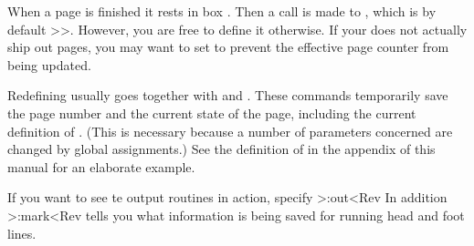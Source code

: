When a page is finished it rests in box . Then a call is
made  to , which is by default
\ver>\shipout\box\WholePage>. However, you are free to define it
otherwise. If your  does not actually ship out pages,
you may want to set  to prevent the effective page
counter from being updated.

Redefining  usually goes together with
 and . These commands
temporarily save the page number and the current state of the page,
including the current definition of . (This is necessary
because a number of parameters concerned are changed by global
assignments.) See the definition of  in the appendix of
this manual for an elaborate example. 

If you want to see te output routines in action, specify
\Ver>\Trace:out<Rev In addition \Ver>\Trace:mark<Rev tells you what
information is being saved for running head and foot lines.

\endinput

92/11/20 Left right output examples
93/01/17 New description of \CurrentShipout
